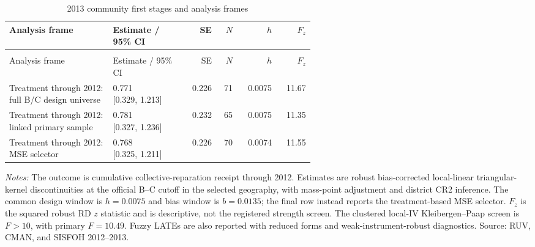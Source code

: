 \begingroup\fontsize{9.25}{11.4}\selectfont
\setlength{\tabcolsep}{3pt}\renewcommand{\arraystretch}{1.18}
\begin{longtable}{@{}>{\raggedright\arraybackslash}p{0.34\linewidth}p{0.24\linewidth}rrrr@{}}
\caption{2013 community first stages and analysis frames}\label{tab:pub_A11} \\
\toprule Analysis frame & Estimate / 95\% CI & SE & \(N\) & \(h\) & \(F_z\) \\ \midrule\endfirsthead
\multicolumn{6}{c}{\tablename\ \thetable{} -- continued} \\
\toprule Analysis frame & Estimate / 95\% CI & SE & \(N\) & \(h\) & \(F_z\) \\ \midrule\endhead
Treatment through 2012: full B/C design universe & \shortstack[r]{0.771 \\{} [0.329, 1.213]} & 0.226 & 71 & 0.0075 & 11.67 \\
Treatment through 2012: linked primary sample & \shortstack[r]{0.781 \\{} [0.327, 1.236]} & 0.232 & 65 & 0.0075 & 11.35 \\
Treatment through 2012: MSE selector & \shortstack[r]{0.768 \\{} [0.325, 1.211]} & 0.226 & 70 & 0.0074 & 11.55 \\
\bottomrule\end{longtable}
\parbox{0.97\linewidth}{\footnotesize \textit{Notes:} The outcome is cumulative collective-reparation receipt through 2012. Estimates are robust bias-corrected local-linear triangular-kernel discontinuities at the official B--C cutoff in the selected geography, with mass-point adjustment and district CR2 inference. The common design window is \(h=0.0075\) and bias window is \(b=0.0135\); the final row instead reports the treatment-based MSE selector. \(F_z\) is the squared robust RD \(z\) statistic and is descriptive, not the registered strength screen. The clustered local-IV Kleibergen--Paap screen is \(F>10\), with primary \(F=10.49\). Fuzzy LATEs are also reported with reduced forms and weak-instrument-robust diagnostics. Source: RUV, CMAN, and SISFOH 2012--2013.}
\par{}\par\endgroup
